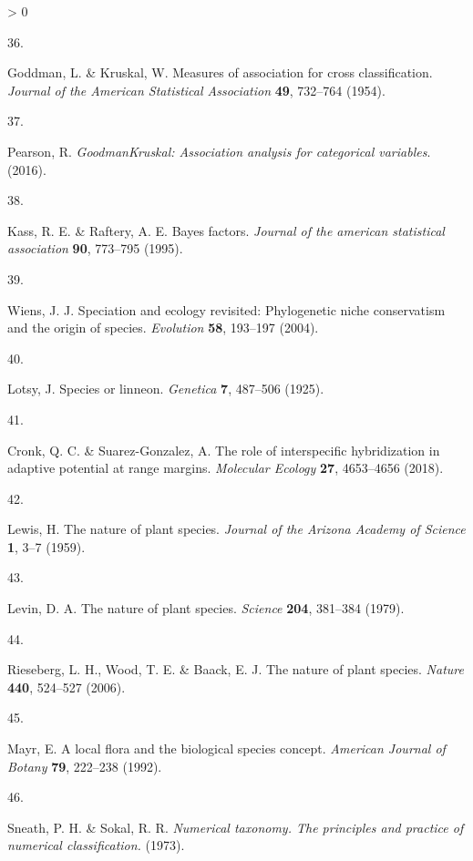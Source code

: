 \documentclass[
  11pt,
]{article}
\newlength{\cslhangindent}
\newlength{\csllabelwidth}
\newenvironment{CSLReferences}[2] %
 {%
  \setlength{\parindent}{0pt}
  \ifodd #1 \everypar{\setlength{\hangindent}{\cslhangindent}}\ignorespaces\fi
  \ifnum #2 > 0
  \setlength{\parskip}{#2\baselineskip}
  \fi
 }%
 {}
\newcommand{\CSLLeftMargin}[1]{\parbox[t]{\csllabelwidth}{#1}}
\newcommand{\CSLRightInline}[1]{\parbox[t]{\linewidth - \csllabelwidth}{#1}\break}
\begin{document}
\begin{CSLReferences}{0}{0}
\leavevmode\hypertarget{ref-goddman1954measures}{}%
\CSLLeftMargin{36. }
\CSLRightInline{Goddman, L. \& Kruskal, W. Measures of association for cross classification. \emph{Journal of the American Statistical Association} \textbf{49}, 732--764 (1954).}

\leavevmode\hypertarget{ref-PearsonGKt2016}{}%
\CSLLeftMargin{37. }
\CSLRightInline{Pearson, R. \emph{GoodmanKruskal: Association analysis for categorical variables}. (2016).}

\leavevmode\hypertarget{ref-kass1995bayes}{}%
\CSLLeftMargin{38. }
\CSLRightInline{Kass, R. E. \& Raftery, A. E. Bayes factors. \emph{Journal of the american statistical association} \textbf{90}, 773--795 (1995).}

\leavevmode\hypertarget{ref-wiens2004speciation}{}%
\CSLLeftMargin{39. }
\CSLRightInline{Wiens, J. J. Speciation and ecology revisited: Phylogenetic niche conservatism and the origin of species. \emph{Evolution} \textbf{58}, 193--197 (2004).}

\leavevmode\hypertarget{ref-lotsy1925species}{}%
\CSLLeftMargin{40. }
\CSLRightInline{Lotsy, J. Species or linneon. \emph{Genetica} \textbf{7}, 487--506 (1925).}

\leavevmode\hypertarget{ref-cronk2018role}{}%
\CSLLeftMargin{41. }
\CSLRightInline{Cronk, Q. C. \& Suarez-Gonzalez, A. The role of interspecific hybridization in adaptive potential at range margins. \emph{Molecular Ecology} \textbf{27}, 4653--4656 (2018).}

\leavevmode\hypertarget{ref-lewis1959nature}{}%
\CSLLeftMargin{42. }
\CSLRightInline{Lewis, H. The nature of plant species. \emph{Journal of the Arizona Academy of Science} \textbf{1}, 3--7 (1959).}

\leavevmode\hypertarget{ref-levin1979nature}{}%
\CSLLeftMargin{43. }
\CSLRightInline{Levin, D. A. The nature of plant species. \emph{Science} \textbf{204}, 381--384 (1979).}

\leavevmode\hypertarget{ref-rieseberg2006nature}{}%
\CSLLeftMargin{44. }
\CSLRightInline{Rieseberg, L. H., Wood, T. E. \& Baack, E. J. The nature of plant species. \emph{Nature} \textbf{440}, 524--527 (2006).}

\leavevmode\hypertarget{ref-mayr1992local}{}%
\CSLLeftMargin{45. }
\CSLRightInline{Mayr, E. A local flora and the biological species concept. \emph{American Journal of Botany} \textbf{79}, 222--238 (1992).}

\leavevmode\hypertarget{ref-sneath1973numerical}{}%
\CSLLeftMargin{46. }
\CSLRightInline{Sneath, P. H. \& Sokal, R. R. \emph{Numerical taxonomy. The principles and practice of numerical classification.} (1973).}


\end{CSLReferences}
\end{document}
